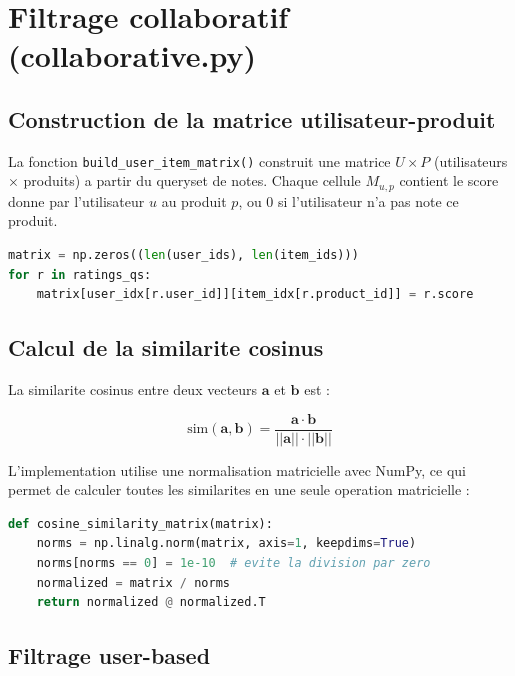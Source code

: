 \documentclass[12pt,a4paper]{report}
\newcommand{\fonction}[1]{\texttt{#1()}}
\begin{document}
\section{Filtrage collaboratif (collaborative.py)}

\subsection{Construction de la matrice utilisateur-produit}

La fonction \fonction{build\_user\_item\_matrix} construit une matrice
$U \times P$ (utilisateurs $\times$ produits) a partir du queryset de notes.
Chaque cellule $M_{u,p}$ contient le score donne par l'utilisateur $u$ au
produit $p$, ou 0 si l'utilisateur n'a pas note ce produit.

\begin{lstlisting}[language=Python,caption={Construction de la matrice}]
matrix = np.zeros((len(user_ids), len(item_ids)))
for r in ratings_qs:
    matrix[user_idx[r.user_id]][item_idx[r.product_id]] = r.score
\end{lstlisting}

\subsection{Calcul de la similarite cosinus}

La similarite cosinus entre deux vecteurs $\mathbf{a}$ et $\mathbf{b}$ est :

\begin{equation}
\text{sim}(\mathbf{a}, \mathbf{b}) = \frac{\mathbf{a} \cdot \mathbf{b}}{||\mathbf{a}|| \cdot ||\mathbf{b}||}
\end{equation}

L'implementation utilise une normalisation matricielle avec NumPy, ce qui
permet de calculer toutes les similarites en une seule operation matricielle :

\begin{lstlisting}[language=Python,caption={Calcul matriciel de la similarite cosinus}]
def cosine_similarity_matrix(matrix):
    norms = np.linalg.norm(matrix, axis=1, keepdims=True)
    norms[norms == 0] = 1e-10  # evite la division par zero
    normalized = matrix / norms
    return normalized @ normalized.T
\end{lstlisting}

\subsection{Filtrage user-based}
\end{document}
